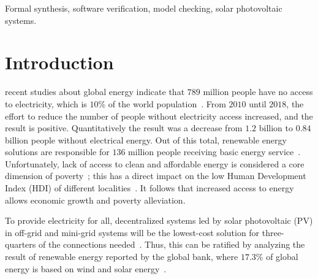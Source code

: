 \documentclass[journal]{IEEEtran}
\begin{document}
\begin{IEEEkeywords}
Formal synthesis, software verification, model checking, solar photovoltaic systems.
\end{IEEEkeywords}






%
\IEEEpeerreviewmaketitle

\section{Introduction}
recent studies about global energy indicate that $789$ million people have no access to electricity, which is $10$\% of the world population~\cite{Energyprogressreport}. From $2010$ until $2018$, the effort to reduce the number of people without electricity access increased, and the result is positive. Quantitatively the result was a decrease from $1.2$ billion to $0.84$ billion people without electrical energy. Out of this total, renewable energy solutions are responsible for $136$ million people receiving basic energy service~\cite{Energyprogressreport}. Unfortunately, lack of access to clean and affordable energy is considered a core dimension of poverty~\cite{Hussein2012}; this has a direct impact on the low Human Development Index (HDI) of different localities~\cite{Coelho}. It follows that increased access to energy allows economic growth and poverty alleviation\cite{Karekesi}. 

To provide electricity for all, decentralized systems led by solar photovoltaic (PV) in off-grid and mini-grid systems will be the lowest-cost solution for three-quarters of the connections needed~\cite{Hussein2012}. Thus, this can be ratified by analyzing the result of renewable energy reported by the global bank, where $17.3$\%  of global energy is based on wind and solar energy~\cite{Energyprogressreport}.
\end{document}
